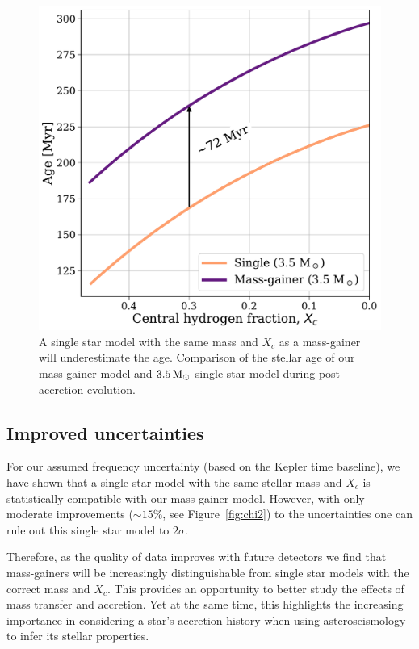 \documentclass[desactivate]{aa}
\begin{document}
\begin{figure}
    \centering
    \includegraphics[width=\columnwidth]{paper/figures/age_xc_relation.pdf}
    \caption{A single star model with the same mass and $X_c$ as a mass-gainer will underestimate the age. Comparison of the stellar age of our mass-gainer model and $3.5 \, {\rm M_\odot}$ single star model during post-accretion evolution.}
    \label{fig:age-Xc}
\end{figure}

\subsection{Improved uncertainties}

For our assumed frequency uncertainty (based on the Kepler time baseline), we have shown that a single star model with the same stellar mass and $X_c$ is statistically compatible with our mass-gainer model. However, with only moderate improvements (${\sim}15\%$, see Figure~\ref{fig:chi2}) to the uncertainties one can rule out this single star model to $2\sigma$.

Therefore, as the quality of data improves with future detectors we find that mass-gainers will be increasingly distinguishable from single star models with the correct mass and $X_c$. This provides an opportunity to better study the effects of mass transfer and accretion. Yet at the same time, this highlights the increasing importance in considering a star's accretion history when using asteroseismology to infer its stellar properties.
\end{document}
